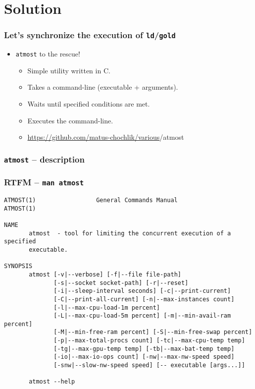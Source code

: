 \documentclass[compress,table,xcolor=table]{beamer}
\newcommand{\shelltext}[1]{\texttt{\colorbox{light-gray}{#1}}}
\begin{document}
\section{Solution}
\begin{frame}
  \frametitle{Let's synchronize the execution of \shelltext{ld}/\shelltext{gold}}
  \begin{itemize}
    \LARGE
    \item \shelltext{atmost} to the rescue!
    \begin{itemize}
	  \large
      \item Simple utility written in C.
      \item Takes a command-line (executable + arguments).
      \item Waits until specified conditions are met.
	  \item Executes the command-line.
	  \item {\small\url{https://github.com/matus-chochlik/various}/atmost}
	  
    \end{itemize}
  \end{itemize}
\end{frame}
\begin{frame}
  \frametitle{\shelltext{atmost} -- description}
  \Large
\end{frame}
\begin{frame}[fragile]
  \frametitle{RTFM -- \shelltext{man atmost}}
\scriptsize
\begin{verbatim}
ATMOST(1)                 General Commands Manual                ATMOST(1)

NAME
       atmost  - tool for limiting the concurrent execution of a specified
       executable.

SYNOPSIS
       atmost [-v|--verbose] [-f|--file file-path]
              [-s|--socket socket-path] [-r|--reset]
              [-i|--sleep-interval seconds] [-c|--print-current]
              [-C|--print-all-current] [-n|--max-instances count]
              [-l|--max-cpu-load-1m percent]
              [-L|--max-cpu-load-5m percent] [-m|--min-avail-ram percent]
              [-M|--min-free-ram percent] [-S|--min-free-swap percent]
              [-p|--max-total-procs count] [-tc|--max-cpu-temp temp]
              [-tg|--max-gpu-temp temp] [-tb|--max-bat-temp temp]
              [-io|--max-io-ops count] [-nw|--max-nw-speed speed]
              [-snw|--slow-nw-speed speed] [-- executable [args...]]

       atmost --help
\end{verbatim}
\end{frame}
\end{document}
